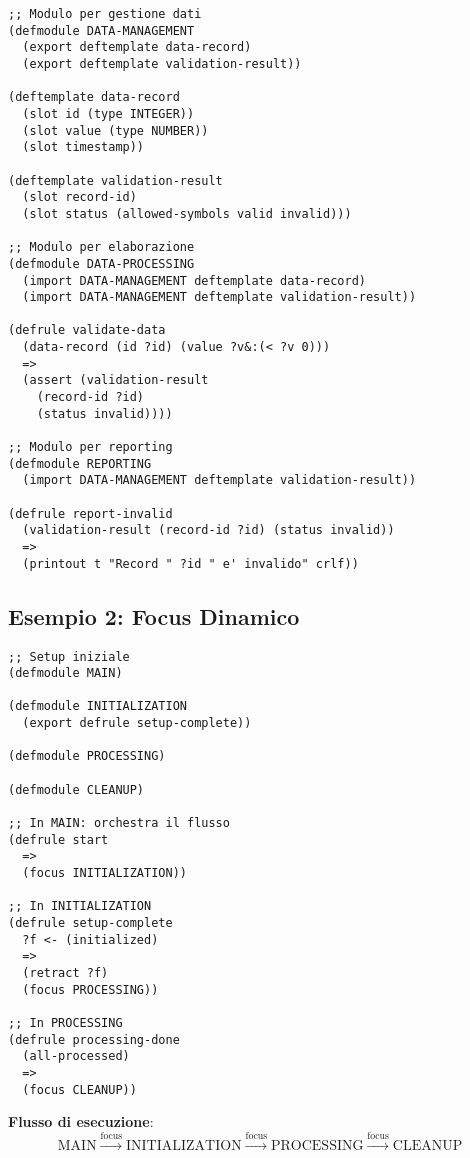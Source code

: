 \begin{lstlisting}[language=CLIPS]
;; Modulo per gestione dati
(defmodule DATA-MANAGEMENT
  (export deftemplate data-record)
  (export deftemplate validation-result))

(deftemplate data-record
  (slot id (type INTEGER))
  (slot value (type NUMBER))
  (slot timestamp))

(deftemplate validation-result
  (slot record-id)
  (slot status (allowed-symbols valid invalid)))

;; Modulo per elaborazione
(defmodule DATA-PROCESSING
  (import DATA-MANAGEMENT deftemplate data-record)
  (import DATA-MANAGEMENT deftemplate validation-result))

(defrule validate-data
  (data-record (id ?id) (value ?v&:(< ?v 0)))
  =>
  (assert (validation-result 
    (record-id ?id) 
    (status invalid))))

;; Modulo per reporting
(defmodule REPORTING
  (import DATA-MANAGEMENT deftemplate validation-result))

(defrule report-invalid
  (validation-result (record-id ?id) (status invalid))
  =>
  (printout t "Record " ?id " e' invalido" crlf))
\end{lstlisting}

\subsection{Esempio 2: Focus Dinamico}

\begin{lstlisting}[language=CLIPS]
;; Setup iniziale
(defmodule MAIN)

(defmodule INITIALIZATION
  (export defrule setup-complete))

(defmodule PROCESSING)

(defmodule CLEANUP)

;; In MAIN: orchestra il flusso
(defrule start
  =>
  (focus INITIALIZATION))

;; In INITIALIZATION
(defrule setup-complete
  ?f <- (initialized)
  =>
  (retract ?f)
  (focus PROCESSING))

;; In PROCESSING  
(defrule processing-done
  (all-processed)
  =>
  (focus CLEANUP))
\end{lstlisting}

\textbf{Flusso di esecuzione}:
\begin{equation}
\text{MAIN} \xrightarrow{\text{focus}} \text{INITIALIZATION} \xrightarrow{\text{focus}} \text{PROCESSING} \xrightarrow{\text{focus}} \text{CLEANUP}
\end{equation}

